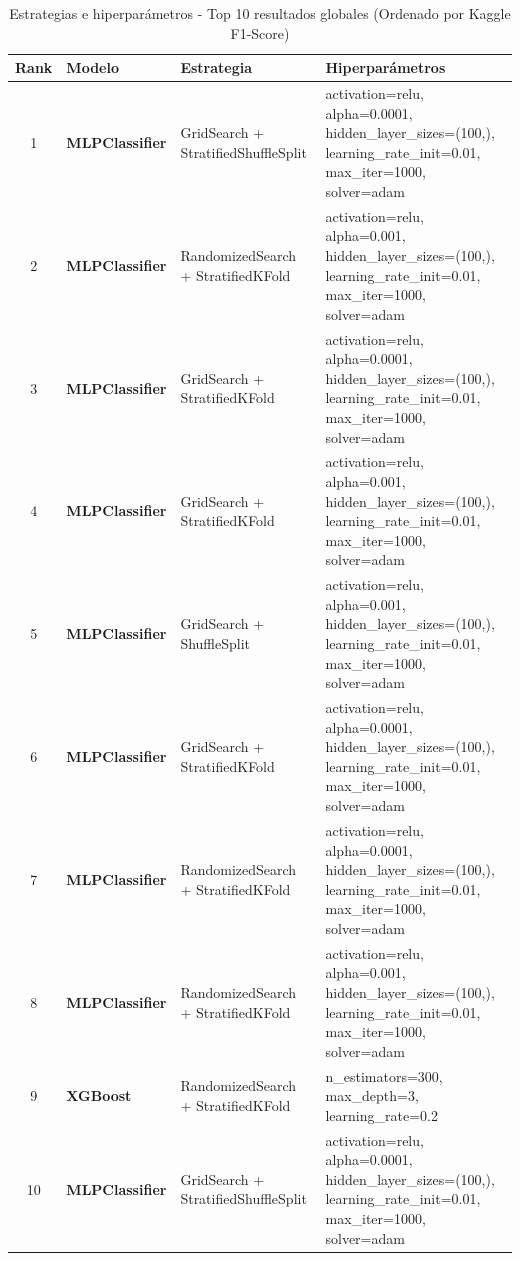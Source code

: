 \documentclass{article}
\begin{document}
\begin{table}[H]
    \centering
    \begin{tabular}{|c|l|l|p{3.5cm}|}
    \hline
    \rowcolor{tableblue} \textbf{Rank} & \textbf{Modelo} & \textbf{Estrategia} & \textbf{Hiperparámetros} \\
    \hline
    \rowcolor{purple!30} 1 & \textbf{MLPClassifier} & GridSearch + StratifiedShuffleSplit & \tiny{activation=relu, alpha=0.0001, hidden\_layer\_sizes=(100,), learning\_rate\_init=0.01, max\_iter=1000, solver=adam} \\
    \hline
    \rowcolor{blue!20} 2 & \textbf{MLPClassifier} & RandomizedSearch + StratifiedKFold & \tiny{activation=relu, alpha=0.001, hidden\_layer\_sizes=(100,), learning\_rate\_init=0.01, max\_iter=1000, solver=adam} \\
    \hline
    \rowcolor{purple!30} 3 & \textbf{MLPClassifier} & GridSearch + StratifiedKFold & \tiny{activation=relu, alpha=0.0001, hidden\_layer\_sizes=(100,), learning\_rate\_init=0.01, max\_iter=1000, solver=adam} \\
    \hline
    \rowcolor{green!20} 4 & \textbf{MLPClassifier} & GridSearch + StratifiedKFold & \tiny{activation=relu, alpha=0.001, hidden\_layer\_sizes=(100,), learning\_rate\_init=0.01, max\_iter=1000, solver=adam} \\
    \hline
    \rowcolor{purple!30} 5 & \textbf{MLPClassifier} & GridSearch + ShuffleSplit & \tiny{activation=relu, alpha=0.001, hidden\_layer\_sizes=(100,), learning\_rate\_init=0.01, max\_iter=1000, solver=adam} \\
    \hline
    \rowcolor{orange!40} 6 & \textbf{MLPClassifier} & GridSearch + StratifiedKFold & \tiny{activation=relu, alpha=0.0001, hidden\_layer\_sizes=(100,), learning\_rate\_init=0.01, max\_iter=1000, solver=adam} \\
    \hline
    \rowcolor{purple!30} 7 & \textbf{MLPClassifier} & RandomizedSearch + StratifiedKFold & \tiny{activation=relu, alpha=0.0001, hidden\_layer\_sizes=(100,), learning\_rate\_init=0.01, max\_iter=1000, solver=adam} \\
    \hline
    \rowcolor{green!20} 8 & \textbf{MLPClassifier} & RandomizedSearch + StratifiedKFold & \tiny{activation=relu, alpha=0.001, hidden\_layer\_sizes=(100,), learning\_rate\_init=0.01, max\_iter=1000, solver=adam} \\
    \hline
    \rowcolor{yellow!60} 9 & \textbf{XGBoost} & RandomizedSearch + StratifiedKFold & \tiny{n\_estimators=300, max\_depth=3, learning\_rate=0.2} \\
    \hline
    \rowcolor{blue!20} 10 & \textbf{MLPClassifier} & GridSearch + StratifiedShuffleSplit & \tiny{activation=relu, alpha=0.0001, hidden\_layer\_sizes=(100,), learning\_rate\_init=0.01, max\_iter=1000, solver=adam} \\
    \hline
    \end{tabular}%
    \caption{Estrategias e hiperparámetros - Top 10 resultados globales (Ordenado por Kaggle F1-Score)}
    \label{tab:estrategias_top10}
\end{table}
\end{document}

